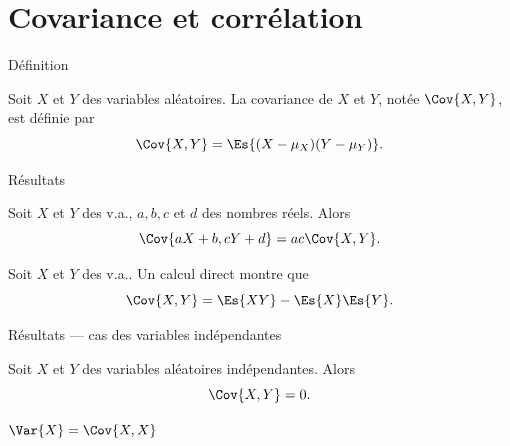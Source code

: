 \documentclass[nuit,charter,pied]{BeamerJS}
\begin{document}
\section{Covariance et corrélation}
\begin{frame}{Définition}
	\pause
	\begin{defn}{}
		Soit $X$ et $Y$ des variables aléatoires. La covariance de $X$ et $Y$, notée $\Cov{X,Y}$, est définie par
		\[\Cov{X,Y}=\Es{(X-\mu_X)(Y-\mu_Y)}.\]
	\end{defn}
\end{frame}
\begin{frame}{Résultats}
	\pause
	\begin{prop}
		Soit $X$ et $Y$ des v.a., $a,b,c$ et $d$ des nombres réels. Alors
		\[\Cov{aX+b,cY+d}=ac\Cov{X,Y}.\]
	\end{prop}
	\begin{prop}
		Soit $X$ et $Y$ des v.a.. Un calcul direct montre que
		\[\Cov{X,Y}=\Es{XY}-\Es{X}\Es{Y}.\]
	\end{prop}
\end{frame}
\begin{frame}{Résultats --- cas des variables indépendantes}
	\pause
	\begin{prop}
		Soit $X$ et $Y$ des variables aléatoires indépendantes. Alors
		\[\Cov{X,Y}=0.\]
	\end{prop}
\begin{lumiere}
	$\Var{X}=\Cov{X,X}$
\end{lumiere}
\end{frame}
\end{document}
